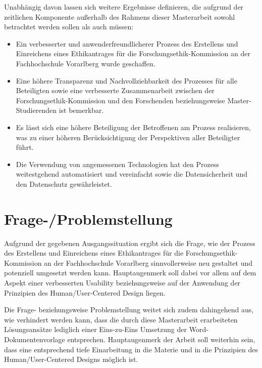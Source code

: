 Unabhängig davon lassen sich weitere Ergebnisse definieren, die aufgrund der zeitlichen Komponente außerhalb des Rahmens dieser Masterarbeit sowohl betrachtet werden sollen als auch müssen:
\begin{itemize}
    \item Ein verbesserter und anwenderfreundlicherer Prozess des Erstellens und Einreichens eines Ethikantrages für die Forschungsethik-Kommission an der Fachhochschule Vorarlberg wurde geschaffen.
    \item Eine höhere Transparenz und Nachvollziehbarkeit des Prozesses für alle Beteiligten sowie eine verbesserte Zusammenarbeit zwischen der Forschungsethik-Kommission und den Forschenden beziehungsweise Master-Studierenden ist bemerkbar.
    \item Es lässt sich eine höhere Beteiligung der Betroffenen am Prozess realisieren, was zu einer höheren Berücksichtigung der Perspektiven aller Beteiligter führt.
    \item Die Verwendung von angemessenen Technologien hat den Prozess weitestgehend automatisiert und vereinfacht sowie die Datensicherheit und den Datenschutz gewährleistet.
\end{itemize}

\section{Frage-/Problemstellung}
\label{sec:frage-problemstellung}

Aufgrund der gegebenen Ausgangssituation ergibt sich die Frage, wie der Prozess des Erstellens und Einreichens eines Ethikantrages für die Forschungsethik-Kommission an der Fachhochschule Vorarlberg sinnvollerweise neu gestaltet und potenziell umgesetzt werden kann. Hauptaugenmerk soll dabei vor allem auf dem Aspekt einer verbesserten Usability beziehungsweise auf der Anwendung der Prinzipien des Human/User-Centered Design liegen.

Die Frage- beziehungsweise Problemstellung weitet sich zudem dahingehend aus, wie verhindert werden kann, dass die durch diese Masterarbeit erarbeiteten Lösungsansätze lediglich einer Eins-zu-Eins Umsetzung der Word-Dokumentenvorlage entsprechen. Hauptaugenmerk der Arbeit soll weiterhin sein, dass eine entsprechend tiefe Einarbeitung in die Materie und in die Prinzipien des Human/User-Centered Designs möglich ist.

\medskip

